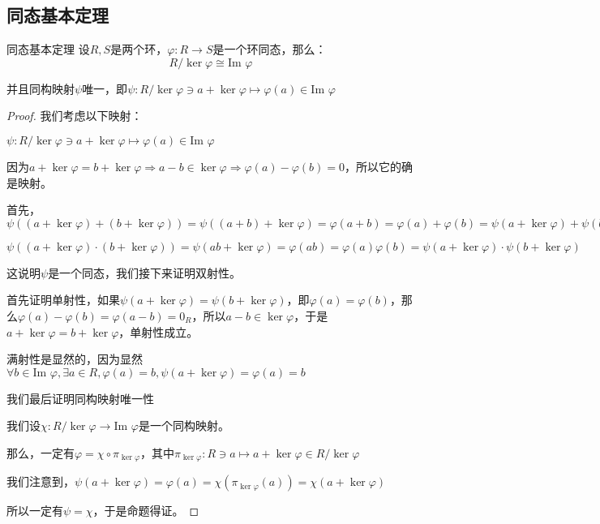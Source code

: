 \documentclass[12pt, a4paper, oneside, UTF8]{ctexbook}
\begin{document}
		\subsection{同态基本定理}
			\begin{them}{同态基本定理}{}
				设$R,S$是两个环，$\varphi : R \rightarrow S$是一个环同态，那么：
				\begin{equation}
					R / \ker \varphi \cong \text{Im }\varphi 
				\end{equation}

				并且同构映射$\psi $唯一，即$\psi : R / \ker \varphi \ni a+\ker \varphi  \mapsto \varphi (a) \in \text{Im }\varphi $
			\end{them}
			\begin{proof}
				我们考虑以下映射：

				$\psi : R / \ker \varphi \ni a+\ker \varphi  \mapsto \varphi (a) \in \text{Im }\varphi $

				因为$a+\ker \varphi =b+\ker \varphi \Rightarrow a-b \in \ker \varphi \Rightarrow \varphi (a)-\varphi (b)=0$，所以它的确是映射。

				首先，$\psi \left((a+\ker \varphi )+(b+\ker \varphi )\right)=\psi \left((a+b)+\ker \varphi \right)=\varphi (a+b)=\varphi (a)+\varphi (b)=\psi (a+\ker \varphi )+\psi (b+\ker \varphi )$
				
				$\psi \left((a+\ker \varphi )\cdot (b+\ker \varphi )\right)=\psi (ab+\ker \varphi )=\varphi (ab)=\varphi (a)\varphi (b)=\psi (a+\ker \varphi )\cdot \psi (b+\ker \varphi )$

				这说明$\psi $是一个同态，我们接下来证明双射性。

				首先证明单射性，如果$\psi (a+\ker \varphi )=\psi (b+\ker \varphi )$，即$\varphi (a)=\varphi (b)$，那么$\varphi (a)-\varphi (b)=\varphi (a-b)=0_R$，所以$a-b \in \ker \varphi $，于是$a+\ker \varphi =b+\ker \varphi $，单射性成立。

				满射性是显然的，因为显然$\forall b \in \text{Im }\varphi ,\exists a \in R,\varphi (a)=b,\psi (a+\ker \varphi )=\varphi (a)=b$

				我们最后证明同构映射唯一性

				我们设$\chi  : R / \ker \varphi \rightarrow \text{Im }\varphi $是一个同构映射。

				那么，一定有$\varphi =\chi \circ \pi_{\ker \varphi }$，其中$\pi_{\ker \varphi } : R \ni a \mapsto  a+\ker \varphi \in R/\ker \varphi $

				我们注意到，$\psi(a+\ker \varphi )=\varphi (a)=\chi \left(\pi_{\ker \varphi }(a)\right)=\chi(a+\ker \varphi )$
				
				所以一定有$\psi =\chi $，于是命题得证。
			\end{proof}
\end{document}
